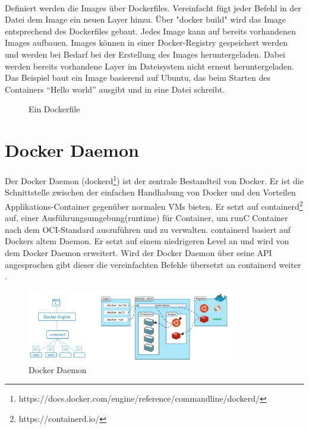 \paragraph{}
Definiert werden die Images über Dockerfiles. Vereinfacht fügt jeder Befehl in der Datei dem Image ein neuen Layer hinzu. Über "docker build" wird das Image entsprechend des Dockerfiles gebaut. Jedes Image kann auf bereits vorhandenen Images aufbauen. Images können in einer Docker-Registry gespeichert werden und werden bei Bedarf bei der Erstellung des Images heruntergeladen. Dabei werden bereits vorhandene Layer im Dateisystem nicht erneut heruntergeladen. Das Beispiel baut ein Image basierend auf Ubuntu, das beim Starten des Containers “Hello world” ausgibt und in eine Datei schreibt.\\

\begin{figure}[!ht]
  \centering
  \caption{Ein Dockerfile}\label{figure:Dockerfile}
\end{figure}


\section{Docker Daemon}

Der Docker Daemon (dockerd\footnote{https://docs.docker.com/engine/reference/commandline/dockerd/}) ist der zentrale Bestandteil von Docker. Er ist die Schnittstelle zwischen der einfachen Handhabung von Docker und den Vorteilen Applikations-Container gegenüber normalen VMs bieten. Er setzt auf containerd\footnote{https://containerd.io/} auf, einer Ausführungsumgebung(runtime) für Container, um runC Container nach dem OCI-Standard auszuführen und zu verwalten. containerd basiert auf Dockers altem Daemon. Er setzt auf einem niedrigeren Level an und wird von dem Docker Daemon erweitert. Wird der Docker Daemon über seine API angesprochen gibt dieser die vereinfachten Befehle übersetzt an containerd weiter \cite{docker:daemon}.\\

\begin{figure}[!ht]
  \centering
  \includegraphics[width=0.8\textwidth]{images/docker-daemon-runc.jpg}
  \caption{Docker Daemon}
\end{figure}


